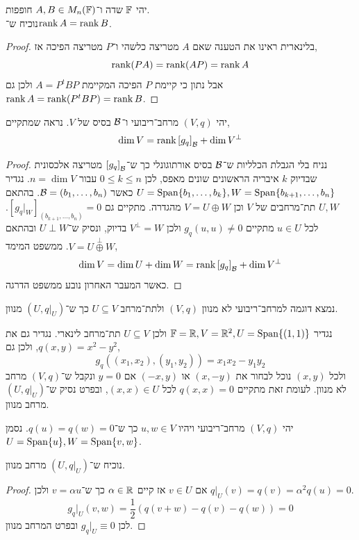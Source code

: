\question{}
יהי $\mathbb{F}$ שדה ו־$A, B \in M_n(\mathbb{F})$ חופפות. \\
נוכיח ש־$\operatorname{rank} A = \operatorname{rank} B$.
\begin{proof}
	בלינארית ראינו את הטענה שאם $A$ מטריצה כלשהי ו־$P$ מטריצה הפיכה אז,
	\[
		\operatorname{rank}(PA)
		= \operatorname{rank}(AP)
		= \operatorname{rank} A
	\]
	אבל נתון כי קיימת $P$ הפיכה המקיימת $A = P^t B P$ ולכן גם $\operatorname{rank} A = \operatorname{rank}(P^t B P) = \operatorname{rank} B$.
\end{proof}

\question{}
יהי $(V, q)$ מרחב־ריבועי ו־$\mathcal{B}$ בסיס של $V$.
נראה שמתקיים,
\[
	\dim V
	= \operatorname{rank} {[g_q]}_{\mathcal{B}} + \dim V^\perp
\]
\begin{proof}
	נניח בלי הגבלת הכלליות ש־$\mathcal{B}$ בסיס אורתוגונלי כך ש־${[g_q]}_{\mathcal{B}}$ מטריצה אלכסונית שבדיוק $k$ איבריה הראשונים שונים מאפס, לכן $0 \le k \le n$ עבור $n = \dim V$.
	נגדיר $U = \operatorname{Span}\{ b_1, \ldots, b_k \}, W = \operatorname{Span}\{ b_{k + 1}, \ldots, b_n \}$ כאשר $\mathcal{B} = (b_1, \ldots, b_n)$.
	בהתאם $U, W$ תת־מרחבים של $V$ וכן $V = U \oplus W$ מהגדרה.
	מתקיים גם ${[g_q|_W]}_{(b_{k + 1}, \ldots, b_n)} = 0$.
	לכל $u \in U$ מתקיים $g_q(u, u) \ne 0$ ולכן $V^\perp = W$ בדיוק, ונסיק ש־$U \perp W$ ובהתאם $V = U \overset{\perp}{\oplus} W$.
	ממשפט המימד,
	\[
		\dim V
		= \dim U + \dim W
		= \operatorname{rank} {[g_q]}_{\mathcal{B}} + \dim V^\perp
	\]
	כאשר המעבר האחרון נובע ממשפט הדרגה.
\end{proof}

\question{}
נמצא דוגמה למרחב־ריבועי לא מנוון $(V, q)$ ולתת־מרחב $U \subseteq V$ כך ש־$(U, q|_U)$ מנוון.
\begin{solution}
	נגדיר $\mathbb{F} = \mathbb{R}, V = \mathbb{R}^2, U = \operatorname{Span}\{ (1, 1) \}$ ולכן $U \subseteq V$ תת־מרחב לינארי.
	נגדיר גם את $q(x, y) = x^2 - y^2$, ולכן גם,
	\[
		g_q((x_1, x_2), (y_1, y_2))
		= x_1 x_2 - y_1 y_2
	\]
	ולכל $(x, y)$ נוכל לבחור את $(x, -y)$ או $(-x, y)$ אם $y = 0$ ונקבל ש־$(V, q)$ מרחב לא מנוון.
	לעומת זאת מתקיים $q(x, x) = 0$ לכל $(x, x) \in U$, ובפרט נסיק ש־$(U, q|_U)$ מרחב מנוון.
\end{solution}

\question{}
יהי $(V, q)$ מרחב־ריבועי ויהיו $u, w \in V$ כך ש־$q(u) = q(w) = 0$.
נסמן $U = \operatorname{Span}\{ u \}, W = \operatorname{Span}\{ v, w \}$.

\subquestion{}
נוכיח ש־$(U, q|_U)$ מרחב מנוון.
\begin{proof}
	אם $v \in U$ אז קיים $\alpha \in \mathbb{R}$ כך ש־$v = \alpha u$ ולכן $q|_U(v) = q(v) = \alpha^2 q(u) = 0$.
	\[
		g_q|_U(v, w)
		= \frac{1}{2} (q(v + w) - q(v) - q(w))
		= 0
	\]
	לכן $g_q|_U \equiv 0$ ובפרט המרחב מנוון.
\end{proof}

